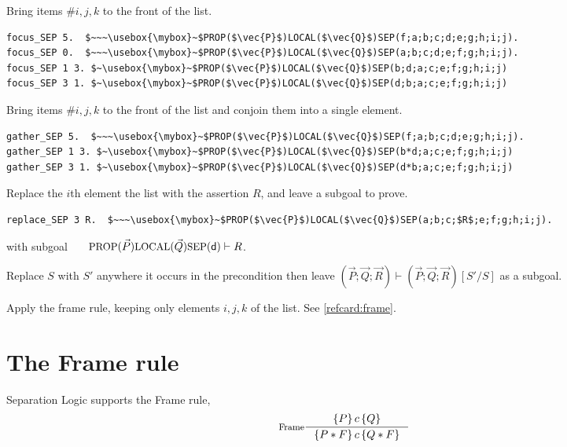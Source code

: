 \documentclass[12pt,fleqn,openany,oneside,showtrims]{memoir}
\newcommand{\ychapter}[2]{\chapter[#1]{#1}}
\begin{document}
\begin{description}\setlength{\itemsep}{2ex}
\item[$\mathsf{focus\_SEP}~i~j~k$.]
Bring items \#$i,j,k$ to the front of the \SEP{} list.
\begin{lstlisting}
focus_SEP 5.  $~~~\usebox{\mybox}~$PROP($\vec{P}$)LOCAL($\vec{Q}$)SEP(f;a;b;c;d;e;g;h;i;j).
focus_SEP 0.  $~~~\usebox{\mybox}~$PROP($\vec{P}$)LOCAL($\vec{Q}$)SEP(a;b;c;d;e;f;g;h;i;j).
focus_SEP 1 3. $~\usebox{\mybox}~$PROP($\vec{P}$)LOCAL($\vec{Q}$)SEP(b;d;a;c;e;f;g;h;i;j)
focus_SEP 3 1. $~\usebox{\mybox}~$PROP($\vec{P}$)LOCAL($\vec{Q}$)SEP(d;b;a;c;e;f;g;h;i;j)
\end{lstlisting}
\item[$\mathsf{gather\_SEP}~i~j~k$.]
Bring items \#$i,j,k$ to the front of the \SEP{} list
and conjoin them into a single element.
\begin{lstlisting}
gather_SEP 5.  $~~~\usebox{\mybox}~$PROP($\vec{P}$)LOCAL($\vec{Q}$)SEP(f;a;b;c;d;e;g;h;i;j).
gather_SEP 1 3. $~\usebox{\mybox}~$PROP($\vec{P}$)LOCAL($\vec{Q}$)SEP(b*d;a;c;e;f;g;h;i;j)
gather_SEP 3 1. $~\usebox{\mybox}~$PROP($\vec{P}$)LOCAL($\vec{Q}$)SEP(d*b;a;c;e;f;g;h;i;j)
\end{lstlisting}
\item[$\mathsf{replace\_SEP}~i~R$.]
Replace the $i$th element the \SEP{} list
with the assertion $R$, and leave a subgoal to prove.
\begin{lstlisting}
replace_SEP 3 R.  $~~~\usebox{\mybox}~$PROP($\vec{P}$)LOCAL($\vec{Q}$)SEP(a;b;c;$R$;e;f;g;h;i;j).
\end{lstlisting}
with subgoal~~~ $\mbox{\small PROP}(\vec{P})\mbox{\small LOCAL}(\vec{Q})\mbox{\small SEP}(\textsf{d}) \vdash R$.
\item[$\mathsf{replace\_in\_pre}~S~S'$.]
Replace $S$ with $S'$ anywhere it occurs in the precondition
then leave
$(\vec{P};\vec{Q};\vec{R}) \vdash (\vec{P};\vec{Q};\vec{R})[S'/S]$
as a subgoal.
\item[$\mathsf{frame\_SEP}~i~j~k.$]
Apply the frame rule, keeping only
elements $i,j,k$ of the \SEP{} list.  See \autoref{refcard:frame}.
\end{description}

\ychapter{The Frame rule}{}
\label{refcard:frame}

Separation Logic supports the Frame rule,
\[\inference[Frame]{\triple{P}{c}{Q}}{\triple{P*F}{c}{Q*F}}\]
\end{document}
